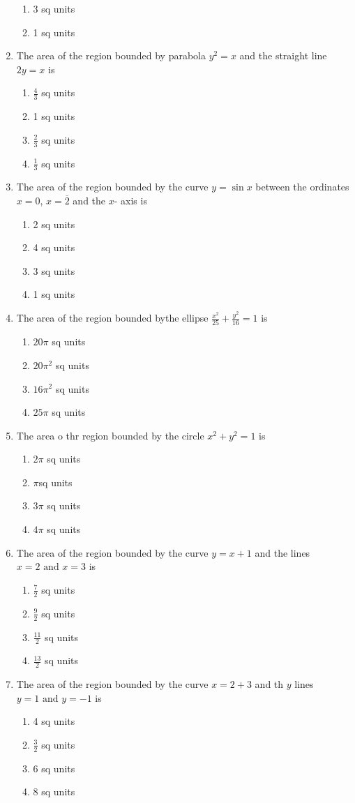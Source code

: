 \documentclass[12pt]{article}
\begin{document}
\begin{enumerate}[resume]
\begin{enumerate}
\item 3 sq units
\item 1 sq units
\end{enumerate}
\item The area of the region bounded by parabola $y^2 = x$ and the straight line $2y = x$ is
\begin{enumerate}
\item $\frac{4}{3}$ sq units
\item 1 sq units
\item $\frac{2}{3}$ sq units 
\item $\frac{1}{3}$ sq units
\end{enumerate}
\item The area of the region bounded by the curve $y = \sin x$ between the ordinates $x = 0$, $x = \overline{2}$ and the $x$- axis is
\begin{enumerate}
\item 2 sq units
\item 4 sq units
\item 3 sq units
\item 1 sq units
\end{enumerate}
\item The area of the region bounded bythe ellipse $\frac{x^2}{25}+\frac{y^2}{16} = 1$ is
\begin{enumerate}
\item ${20\pi}$ sq units
\item ${20\pi^2}$ sq units 
\item ${16\pi^2}$ sq units
\item ${25\pi}$ sq units
\end{enumerate}
\item The area o thr region bounded by the circle $x^2 + y^2 = 1$ is
\begin{enumerate}
\item ${2\pi}$ sq units
\item ${\pi}$sq units
\item ${3\pi}$ sq units
\item ${4\pi}$ sq units
\end{enumerate}
\item The area of the region bounded by the curve $y = x + 1$ and the lines $x = 2\text{ and }x = 3$ is
\begin{enumerate}
\item $\frac{7}{2}$ sq units
\item $\frac{9}{2}$ sq units
\item $\frac{11}{2}$ sq units
\item $\frac{13}{2}$ sq units
\end{enumerate}   
\item The area of the region bounded by the curve $x = 2 + 3$ and th $y$ lines $y = 1\text{ and }y = - 1$ is
\begin{enumerate}
\item 4 sq units 
\item $\frac{3}{2}$ sq units
\item 6 sq units
\item 8 sq units
\end{enumerate}
\end{enumerate}
\end{document}
